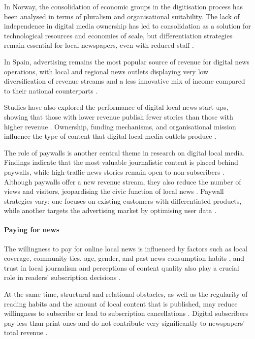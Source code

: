 \documentclass[english]{textolivre}
\begin{document}
In Norway, the consolidation of economic groups in the digitisation process has been analysed in terms of pluralism and organisational suitability. The lack of independence in digital media ownership has led to consolidation as a solution for technological resources and economies of scale, but differentiation strategies remain essential for local newspapers, even with reduced staff \cite{sjovaag2014,sjovaag2021}.

In Spain, advertising remains the most popular source of revenue for digital news operations, with local and regional news outlets displaying very low diversification of revenue streams and a less innovative mix of income compared to their national counterparts \cite{varamiguel2021}.

Studies have also explored the performance of digital local news start-ups, showing that those with lower revenue publish fewer stories than those with higher revenue \cite{chadha2019}. Ownership, funding mechanisms, and organisational mission influence the type of content that digital local media outlets produce \cite{harlow2021}.

The role of paywalls is another central theme in research on digital local media. Findings indicate that the most valuable journalistic content is placed behind paywalls, while high-traffic news stories remain open to non-subscribers \cite{sjovaag2016,kvalheim2013}. Although paywalls offer a new revenue stream, they also reduce the number of views and visitors, jeopardising the civic function of local news \cite{olsen-etal2020}. Paywall strategies vary: one focuses on existing customers with differentiated products, while another targets the advertising market by optimising user data \cite{olsen2018}.

\paragraph{Paying for news}
The willingness to pay for online local news is influenced by factors such as local coverage, community ties, age, gender, and past news consumption habits \cite{goyanes2015}, and trust in local journalism and perceptions of content quality also play a crucial role in readers’ subscription decisions \cite{park2022}.

At the same time, structural and relational obstacles, as well as the regularity of reading habits and the amount of local content that is published, may reduce willingness to subscribe or lead to subscription cancellations \cite{ross2021, kim2021}. Digital subscribers pay less than print ones and do not contribute very significantly to newspapers’ total revenue \cite{chyi2020}.
\end{document}
